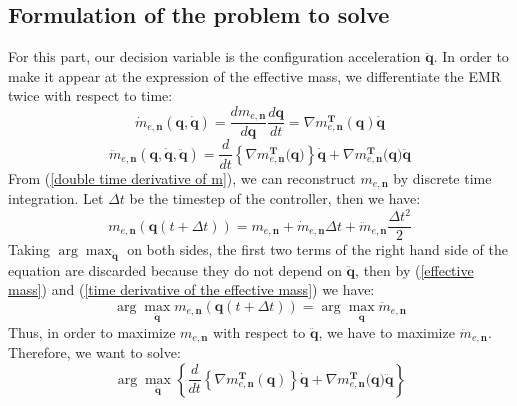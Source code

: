 \documentclass[conference]{IEEEtran}
\begin{document}
\subsection{Formulation of the problem to solve}
\label{QP formulation of EMMT}
\noindent
For this part, our decision variable is the configuration acceleration $\mathbf{\ddot q}$. In order to make it appear at the expression of the effective mass, we differentiate the EMR twice with respect to time:
\begin{equation}
        \dot m_{e,\mathbf{n}} (\mathbf{q}, \mathbf{\dot q}) = \frac{d m_{e,\mathbf{n}}}  {d\mathbf{q} } \frac{d\mathbf{q}}{dt} 
    = \nabla m_{e,\mathbf{n}}^\mathbf{T}(\mathbf{q})  \mathbf{\dot q}
\label{time derivative of the effective mass}
\end{equation}
\begin{equation}
            \ddot m_{e,\mathbf{n}} (\mathbf{q}, \mathbf{\dot q}, \mathbf{\ddot q}) = \frac{d}{dt} \left\{ \nabla m_{e,\mathbf{n}}^\mathbf{T}(\mathbf{q) } \right\} \mathbf{\dot q} + \nabla m_{e,\mathbf{n}}^\mathbf{T}(\mathbf{q) } \mathbf{\ddot q}
\label{double time derivative of m}
\end{equation}
From (\ref{double time derivative of m}), we can reconstruct $m_{e,\mathbf{n}}$ by discrete time integration. Let $\Delta t$ be the timestep of the controller, then we have:
\begin{equation}
    m_{e,\mathbf{n}}(\mathbf{q}(t + \Delta t)) =  m_{e,\mathbf{n}} + \dot m_{e,\mathbf{n}}\Delta t+ \ddot m_{e,\mathbf{n}}\frac{\Delta t^2}{2}
\end{equation}
Taking $\arg \max_{\mathbf{\ddot q}}$ on both sides, the first two terms of the right hand side of the equation are discarded because they do not depend on $\mathbf{\ddot q}$, then  by (\ref{effective mass}) and (\ref{time derivative of the effective mass}) we have:
\begin{equation}
    \arg \max_{\mathbf{\ddot q}}m_{e,\mathbf{n}}(\mathbf{q}(t + \Delta t)) =  \arg \max_{\mathbf{\ddot q}} \ddot m_{e,\mathbf{n}}
\end{equation}
Thus, in order to maximize $m_{e,\mathbf{n}}$ with respect to $\mathbf{\ddot q}$, we have to maximize $\ddot m_{e,\mathbf{n}}$. Therefore, we want to solve:
\begin{equation}
    \arg \max_\mathbf{\ddot q} \left\{ \frac{d}{dt} \left\{ \nabla m_{e,\mathbf{n}}^\mathbf{T}(\mathbf{q}) \right\} \mathbf{\dot q} + \nabla m_{e,\mathbf{n}}^\mathbf{T}(\mathbf{q) } \mathbf{\ddot q} \right\}
\end{equation}
\end{document}
